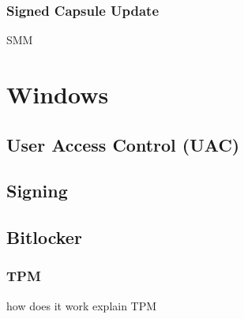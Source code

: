 \subsubsection{Signed Capsule Update}
SMM

\section{Windows}
\subsection{User Access Control (UAC)}
\subsection{Signing}
\subsection{Bitlocker}
\subsubsection{TPM}
how does it work
explain TPM